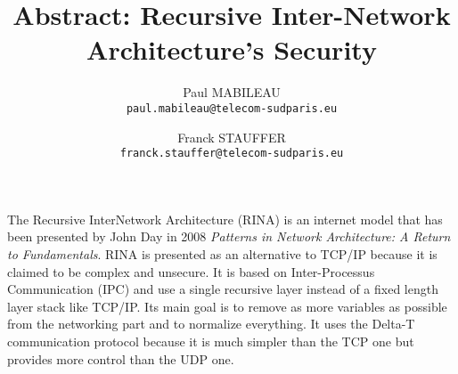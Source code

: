 \documentclass[a4paper]{article}
\author{Paul MABILEAU\\\texttt{paul.mabileau@telecom-sudparis.eu} \and Franck STAUFFER\\\texttt{franck.stauffer@telecom-sudparis.eu}}
\title{\textbf{Abstract: Recursive Inter-Network Architecture's Security}}
\begin{document}
\maketitle

The Recursive InterNetwork Architecture (RINA) is an internet model that has been presented by John Day in 2008 \textit{Patterns in Network Architecture: A Return to Fundamentals}.
RINA is presented as an alternative to TCP/IP because it is claimed to be complex and unsecure.
It is based on Inter-Processus Communication (IPC) and use a single recursive layer instead of a fixed length layer stack like TCP/IP\@.
Its main goal is to remove as more variables as possible from the networking part and to normalize everything.
It uses the Delta-T communication protocol because it is much simpler than the TCP one but provides more control than the UDP one.
\end{document}

